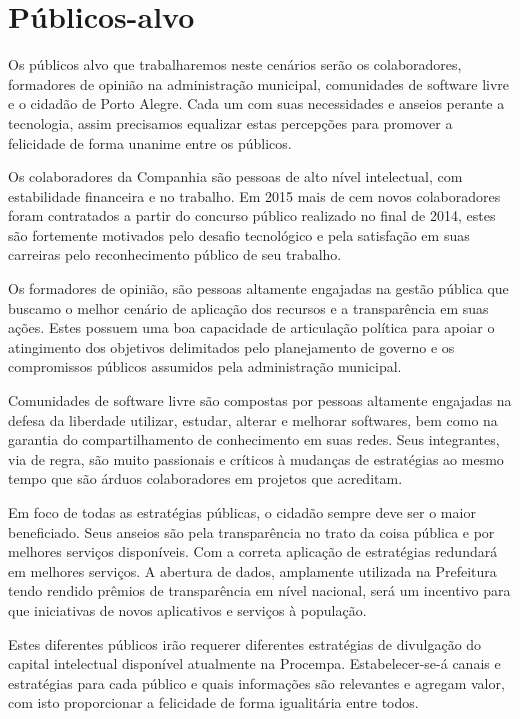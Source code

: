 \section{Públicos-alvo}
Os públicos alvo que trabalharemos neste cenários serão os colaboradores, formadores de opinião na administração municipal, comunidades de software livre e o cidadão de Porto Alegre. Cada um com suas necessidades e anseios perante a tecnologia, assim precisamos equalizar estas percepções para promover a felicidade de forma unanime entre os públicos.

Os colaboradores da Companhia são pessoas de alto nível intelectual, com estabilidade financeira e no trabalho. Em 2015 mais de cem novos colaboradores foram contratados a partir do concurso público realizado no final de 2014, estes são fortemente motivados pelo desafio tecnológico e pela satisfação em suas carreiras pelo reconhecimento público de seu trabalho.

Os formadores de opinião, são pessoas altamente engajadas na gestão pública que buscamo o melhor cenário de aplicação dos recursos e a transparência em suas ações. Estes possuem uma boa capacidade de articulação política para apoiar o atingimento dos objetivos delimitados pelo planejamento de governo e os compromissos públicos assumidos pela administração municipal.

Comunidades de software livre são compostas por pessoas altamente engajadas na defesa da liberdade utilizar, estudar, alterar e melhorar softwares, bem como na garantia do compartilhamento de conhecimento em suas redes. Seus integrantes, via de regra, são muito passionais e críticos à mudanças de estratégias ao mesmo tempo que são árduos colaboradores em projetos que acreditam.

Em foco de todas as estratégias públicas, o cidadão sempre deve ser o maior beneficiado. Seus anseios são pela transparência no trato da coisa pública e por melhores serviços disponíveis. Com a correta aplicação de estratégias redundará em melhores serviços. A abertura de dados, amplamente utilizada na Prefeitura tendo rendido prêmios de transparência em nível nacional, será um incentivo para que iniciativas de novos aplicativos e serviços à população.

Estes diferentes públicos irão requerer diferentes estratégias de divulgação do capital intelectual disponível atualmente na Procempa. Estabelecer-se-á canais e estratégias para cada público e quais informações são relevantes e agregam valor, com isto proporcionar a felicidade de forma igualitária entre todos.
